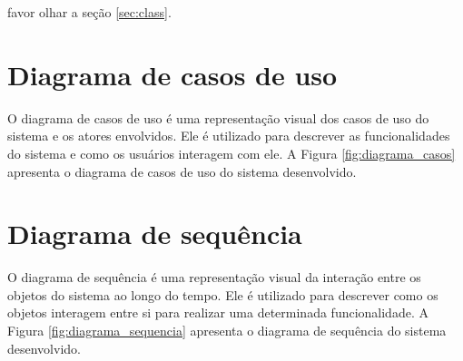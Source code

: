 favor olhar a seção \ref{sec:class}.


\section{Diagrama de casos de uso}
\label{sec:casos}
O diagrama de casos de uso é uma representação visual dos casos de uso do sistema e os atores envolvidos. Ele é utilizado para descrever as funcionalidades do sistema e como os usuários interagem com ele. A Figura \ref{fig:diagrama_casos} apresenta o diagrama de casos de uso do sistema desenvolvido.

\section{Diagrama de sequência}
\label{sec:sequencia}   
O diagrama de sequência é uma representação visual da interação entre os objetos do sistema ao longo do tempo. Ele é utilizado para descrever como os objetos interagem entre si para realizar uma determinada funcionalidade. A Figura \ref{fig:diagrama_sequencia} apresenta o diagrama de sequência do sistema desenvolvido. 









